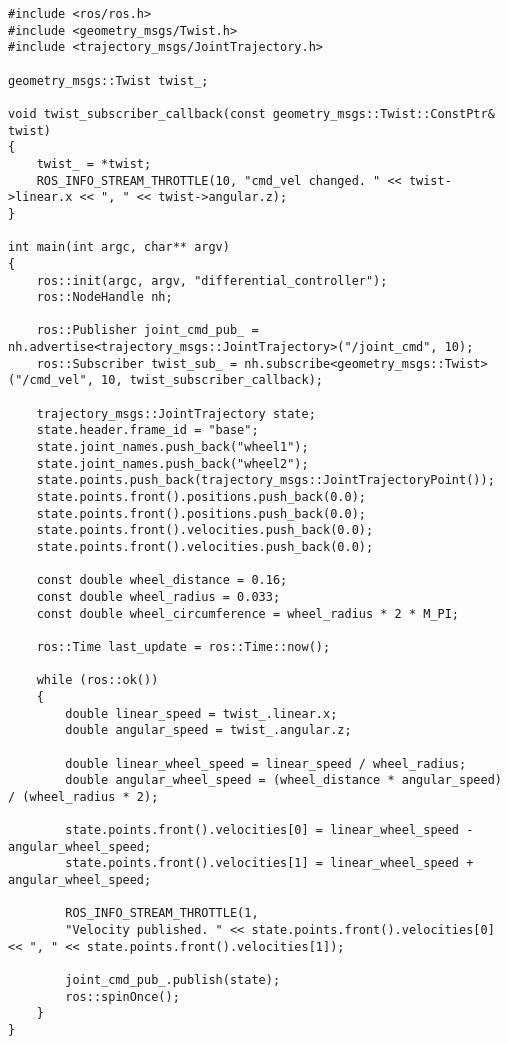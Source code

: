 \documentclass{article}
\begin{document}
\begin{verbatim}
#include <ros/ros.h>
#include <geometry_msgs/Twist.h>
#include <trajectory_msgs/JointTrajectory.h>

geometry_msgs::Twist twist_;

void twist_subscriber_callback(const geometry_msgs::Twist::ConstPtr& twist)
{
	twist_ = *twist;
	ROS_INFO_STREAM_THROTTLE(10, "cmd_vel changed. " << twist->linear.x << ", " << twist->angular.z);
}
  
int main(int argc, char** argv)
{
	ros::init(argc, argv, "differential_controller");
	ros::NodeHandle nh;
	
	ros::Publisher joint_cmd_pub_ = nh.advertise<trajectory_msgs::JointTrajectory>("/joint_cmd", 10);
	ros::Subscriber twist_sub_ = nh.subscribe<geometry_msgs::Twist>("/cmd_vel", 10, twist_subscriber_callback);
	
	trajectory_msgs::JointTrajectory state;
	state.header.frame_id = "base";
	state.joint_names.push_back("wheel1");
	state.joint_names.push_back("wheel2");
	state.points.push_back(trajectory_msgs::JointTrajectoryPoint());
	state.points.front().positions.push_back(0.0);
	state.points.front().positions.push_back(0.0);
	state.points.front().velocities.push_back(0.0);
	state.points.front().velocities.push_back(0.0);
	
	const double wheel_distance = 0.16;
	const double wheel_radius = 0.033;
	const double wheel_circumference = wheel_radius * 2 * M_PI;
	  
	ros::Time last_update = ros::Time::now();
	
	while (ros::ok())
	{
		double linear_speed = twist_.linear.x;
		double angular_speed = twist_.angular.z;
		
		double linear_wheel_speed = linear_speed / wheel_radius;
		double angular_wheel_speed = (wheel_distance * angular_speed) / (wheel_radius * 2);
		  
		state.points.front().velocities[0] = linear_wheel_speed - angular_wheel_speed;
		state.points.front().velocities[1] = linear_wheel_speed + angular_wheel_speed;
		  
		ROS_INFO_STREAM_THROTTLE(1,
		"Velocity published. " << state.points.front().velocities[0] << ", " << state.points.front().velocities[1]);
		
		joint_cmd_pub_.publish(state);
		ros::spinOnce();
	}
}
\end{verbatim}
\end{document}
